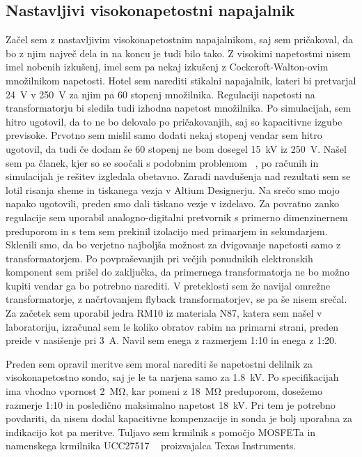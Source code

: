 \documentclass[a4paper,twoside,openright,12pt,slovene]{book}
\begin{document}
	\subsection{Nastavljivi visokonapetostni napajalnik}
	Začel sem z nastavljivim visokonapetostnim napajalnikom, saj sem pričakoval, da bo z njim največ dela in na koncu je tudi bilo tako. Z visokimi napetostmi nisem imel nobenih izkušenj, imel sem pa nekaj izkušenj z Cockcroft-Walton-ovim množilnikom napetosti. Hotel sem narediti stikalni napajalnik, kateri bi pretvarjal \SI{24}{\volt} v \SI{250}{\volt} za njim pa 60 stopenj množilnika. Regulaciji napetosti na transformatorju bi sledila tudi izhodna napetost množilnika. Po simulacijah, sem hitro ugotovil, da to ne bo delovalo po pričakovanjih, saj so kapacitivne izgube previsoke. Prvotno sem mislil samo dodati nekaj stopenj vendar sem hitro ugotovil, da tudi če dodam še 60 stopenj ne bom dosegel \SI{15}{\kilo\volt} iz \SI{250}{\volt}. Našel sem pa članek, kjer so se soočali s podobnim problemom ~\cite{ParallelHighVoltageMultipliers}, po računih in simulacijah je rešitev izgledala obetavno. Zaradi navdušenja nad rezultati sem se lotil risanja sheme in tiskanega vezja v Altium Designerju. Na srečo smo mojo napako ugotovili, preden smo dali tiskano vezje v izdelavo. Za povratno zanko regulacije sem uporabil analogno-digitalni pretvornik s primerno dimenzinernem preduporom in s tem sem prekinil izolacijo med primarjem in sekundarjem. Sklenili smo, da bo verjetno najboljša možnost za dvigovanje napetosti samo z transformatorjem. Po povpraševanjih pri večjih ponudnikih elektronskih komponent sem prišel do zaključka, da primernega transformatorja ne bo možno kupiti vendar ga bo potrebno narediti. V preteklosti sem že navijal omrežne transformatorje, z načrtovanjem flyback transformatorjev, se pa še nisem srečal. Za začetek sem uporabil jedra RM10 iz materiala N87, katera sem našel v laboratoriju, izračunal sem le koliko obratov rabim na primarni strani, preden preide v nasišenje pri \SI{3}{\ampere}. Navil sem enega z razmerjem 1:10 in enega z 1:20.

Preden sem opravil meritve sem moral narediti še napetostni delilnik za visokonapetostno sondo, saj je le ta narjena samo za \SI{1.8}{\kilo\volt}. Po specifikacijah ima vhodno vpornost \SI{2}{\mega\ohm}, kar pomeni z \SI{18}{\mega\ohm} preduporom, dosežemo razmerje 1:10 in posledično maksimalno napetost \SI{18}{\kilo\volt}. Pri tem je potrebno povdariti, da nisem dodal kapacitivne kompenzacije in sonda je bolj uporabna za indikacijo kot pa meritve. Tuljavo sem krmilnik s pomočjo MOSFETa in namenskega krmilnika UCC27517 ~\cite{TI:UCC28740} proizvajalca Texas Instruments.
\end{document}
